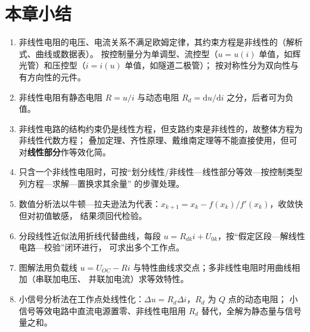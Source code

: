 \section{本章小结}
\begin{enumerate}
  \item 非线性电阻的电压、电流关系不满足欧姆定律，其约束方程是非线性的（解析式、曲线或数据表）。
        按控制量分为单调型、流控型（$u=u(i)$ 单值，如辉光管）和压控型（$i=i(u)$ 单值，如隧道二极管）；
        按对称性分为双向性与有方向性的元件。
  \item 非线性电阻有静态电阻 $R=u/i$ 与动态电阻 $R_d=\mathrm{d}u/\mathrm{d}i$ 之分，后者可为负值。
  \item 非线性电路的结构约束仍是线性方程，但支路约束是非线性的，故整体方程为非线性代数方程；
        叠加定理、齐性原理、戴维南定理等不能直接使用，但可对\textbf{线性部分}作等效化简。
  \item 只含一个非线性电阻时，可按“划分线性/非线性—线性部分等效—按控制类型列方程—求解—置换求其余量”
        的步骤处理。
  \item 数值分析法以牛顿—拉夫逊法为代表：$x_{k+1}=x_k-f(x_k)/f'(x_k)$，收敛快但对初值敏感，
        结果须回代检验。
  \item 分段线性近似法用折线代替曲线，每段 $u=R_{dk}i+U_{0k}$，按“假定区段—解线性电路—校验”闭环进行，
        可求出多个工作点。
  \item 图解法用负载线 $u=U_{OC}-Ri$ 与特性曲线求交点；多非线性电阻时用曲线相加（串联加电压、
        并联加电流）求等效特性。
  \item 小信号分析法在工作点处线性化：$\Delta u=R_d\Delta i$，$R_d$ 为 $Q$ 点的动态电阻；
        小信号等效电路中直流电源置零、非线性电阻用 $R_d$ 替代，全解为静态量与信号量之和。
\end{enumerate}

\endinput
